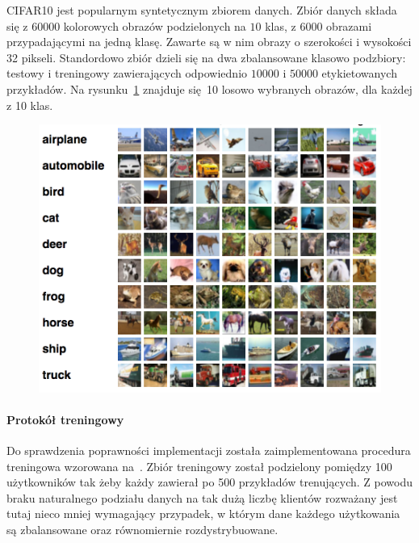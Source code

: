   CIFAR10 jest popularnym syntetycznym zbiorem danych. Zbiór danych składa się z \(\num{60000}\)
  kolorowych obrazów podzielonych na \(\num{10}\) klas, z \(\num{6000}\) obrazami przypadającymi
  na jedną klasę. Zawarte są w nim obrazy o szerokości i wysokości 32 pikseli. Standordowo zbiór
  dzieli się na dwa zbalansowane klasowo podzbiory: testowy i treningowy zawierających odpowiednio
  \(10000\) i \(50000\) etykietowanych przykładów. Na rysunku~\ref{fig:cifar10_example} znajduje się 10 losowo wybranych obrazów, dla każdej z 10 klas.

  \begin{figure}[t]
    \centering
    \includegraphics[width=1.0\textwidth]{img/cifar10_example.png}
    \label{fig:cifar10_example}
  \end{figure}

  \paragraph{Protokół treningowy}

  Do sprawdzenia poprawności implementacji została zaimplementowana procedura treningowa wzorowana
  na~\cite{mcmahan2016communicationefficient}. Zbiór treningowy został podzielony pomiędzy 100 użytkowników tak żeby każdy zawierał po 500 przykładów trenujących. Z powodu braku naturalnego podziału danych na tak dużą liczbę klientów rozważany jest tutaj nieco mniej wymagający przypadek, w którym dane każdego użytkowania są zbalansowane oraz równomiernie rozdystrybuowane.

